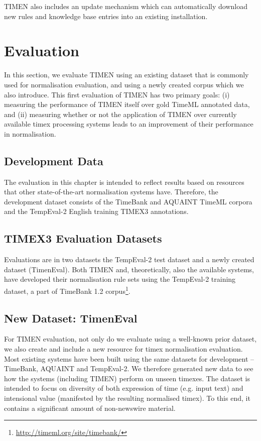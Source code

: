 \documentclass[10pt, a4paper]{article}
\begin{document}
TIMEN also includes an update mechanism which can automatically download new rules and knowledge base entries into an existing installation.


\section{Evaluation}
\label{evaluation}

In this section, we evaluate TIMEN using an existing dataset that is commonly used for normalisation evaluation, and using a newly created corpus which we also introduce. This first evaluation of TIMEN has two primary goals: (i) measuring the performance of TIMEN itself over gold TimeML annotated data, and (ii) measuring whether or not the application of TIMEN over currently available timex processing systems leads to an improvement of their performance in normalisation.

\subsection{Development Data}
The evaluation in this chapter is intended to reflect results based on resources that other state-of-the-art normalisation systems have. Therefore, the development dataset consists of the TimeBank and AQUAINT TimeML corpora and the TempEval-2 English training TIMEX3 annotations.

\subsection{TIMEX3 Evaluation Datasets}
Evaluations are in two datasets the TempEval-2 test dataset and a newly created dataset (TimenEval).
Both TIMEN and, theoretically, also the available systems, have developed their normalisation rule sets using the TempEval-2 training dataset, a part of TimeBank 1.2 corpus\footnote{\scriptsize \url{http://timeml.org/site/timebank/}}.

\subsection{New Dataset: TimenEval}
For TIMEN evaluation, not only do we evaluate using a well-known prior dataset, we also create and include a new resource for timex normalisation evaluation.
Most existing systems have been built using the same datasets for development -- TimeBank, AQUAINT and TempEval-2.
We therefore generated new data to see how the systems (including TIMEN) perform on unseen timexes. The dataset is intended to focus on diversity of both expression of time (e.g. input text) and intensional value (manifested by the resulting normalised timex). To this end, it contains a significant amount of non-newswire material.
\end{document}
